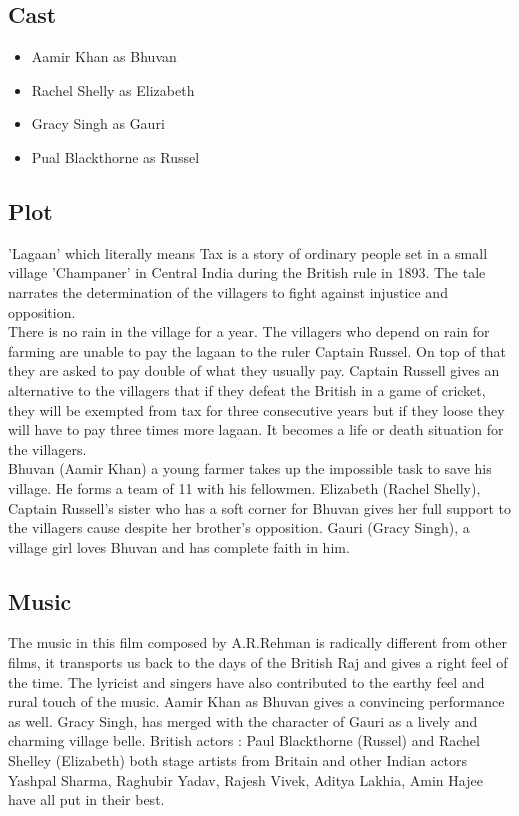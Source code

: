 \documentclass[a4paper]{article}
\begin{document}
	  \subsection {Cast}
	  \begin{itemize}
\item Aamir Khan as Bhuvan
\item Rachel Shelly as Elizabeth
\item Gracy Singh as Gauri
\item Pual Blackthorne as Russel
\end{itemize}
	  \subsection{Plot }
    
	  'Lagaan' which literally means Tax is a story of ordinary people set in a small village 'Champaner' in Central India during the British rule in 1893. The tale narrates the determination of the villagers to fight against injustice and opposition.
	  \\
	  There is no rain in the village for a year. The villagers who depend on rain for farming are unable to pay the lagaan to the ruler Captain Russel. On top of that they are asked to pay double of what they usually pay. Captain Russell gives an alternative to the villagers that if they defeat the British in a game of cricket, they will be exempted from tax for three consecutive years but if they loose they will have to pay three times more lagaan. It becomes a life or death situation for the villagers.
\\	  
	  Bhuvan (Aamir Khan) a young farmer takes up the impossible task to save his village. He forms a team of 11 with his fellowmen. Elizabeth (Rachel Shelly), Captain Russell's sister who has a soft corner for Bhuvan gives her full support to the villagers cause despite her brother's opposition. Gauri (Gracy Singh), a village girl loves Bhuvan and has complete faith in him.


\subsection{Music}


The music in this film composed by A.R.Rehman is radically different from other films, it transports us back to the days of the British Raj and gives a right feel of the time. The lyricist and singers have also contributed to the earthy feel and rural touch of the music. Aamir Khan as Bhuvan gives a convincing performance as well. Gracy Singh, has merged with the character of Gauri as a lively and charming village belle. British actors : Paul Blackthorne (Russel) and Rachel Shelley (Elizabeth) both stage artists from Britain and other Indian actors Yashpal Sharma, Raghubir Yadav, Rajesh Vivek, Aditya Lakhia, Amin Hajee have all put in their best.
\end{document}
